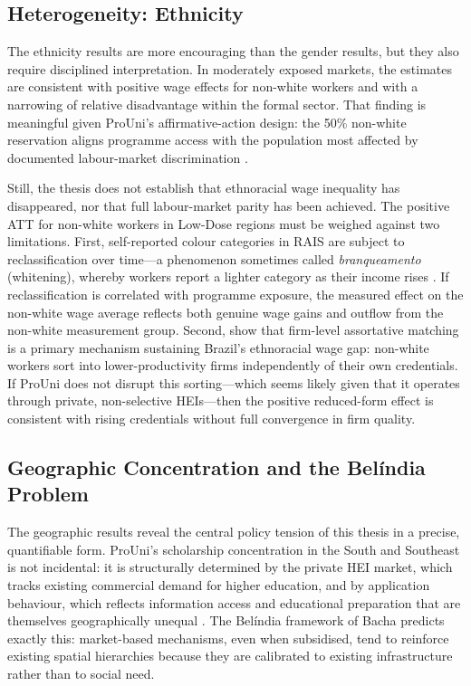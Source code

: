\subsection{Heterogeneity: Ethnicity}

The ethnicity results are more encouraging than the gender results, but they also require disciplined interpretation. In moderately exposed markets, the estimates are consistent with positive wage effects for non-white workers and with a narrowing of relative disadvantage within the formal sector. That finding is meaningful given ProUni's affirmative-action design: the 50\% non-white reservation aligns programme access with the population most affected by documented labour-market discrimination \cite{Cornwell2017, AriasYamadaTejerina2002}.

Still, the thesis does not establish that ethnoracial wage inequality has disappeared, nor that full labour-market parity has been achieved. The positive ATT for non-white workers in Low-Dose regions must be weighed against two limitations. First, self-reported colour categories in RAIS are subject to reclassification over time---a phenomenon sometimes called \emph{branqueamento} (whitening), whereby workers report a lighter category as their income rises \cite[p.~86]{Telles2004}. If reclassification is correlated with programme exposure, the measured effect on the non-white wage average reflects both genuine wage gains and outflow from the non-white measurement group. Second,  show that firm-level assortative matching is a primary mechanism sustaining Brazil's ethnoracial wage gap: non-white workers sort into lower-productivity firms independently of their own credentials. If ProUni does not disrupt this sorting---which seems likely given that it operates through private, non-selective HEIs---then the positive reduced-form effect is consistent with rising credentials without full convergence in firm quality.

\subsection{Geographic Concentration and the Bel\'india Problem}
\label{sec:belindia}

The geographic results reveal the central policy tension of this thesis in a precise, quantifiable form. ProUni's scholarship concentration in the South and Southeast is not incidental: it is structurally determined by the private HEI market, which tracks existing commercial demand for higher education, and by application behaviour, which reflects information access and educational preparation that are themselves geographically unequal \cite{McCowan2007}. The Bel\'india framework of Bacha \cite{bacha1976, Telles2004} predicts exactly this: market-based mechanisms, even when subsidised, tend to reinforce existing spatial hierarchies because they are calibrated to existing infrastructure rather than to social need.

